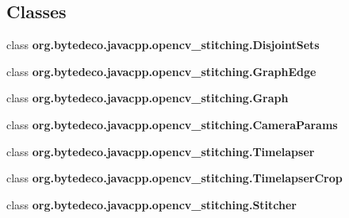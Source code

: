 \subsection*{Classes}
\begin{DoxyCompactItemize}
\item 
class {\bfseries org.\+bytedeco.\+javacpp.\+opencv\+\_\+stitching.\+Disjoint\+Sets}
\item 
class {\bfseries org.\+bytedeco.\+javacpp.\+opencv\+\_\+stitching.\+Graph\+Edge}
\item 
class {\bfseries org.\+bytedeco.\+javacpp.\+opencv\+\_\+stitching.\+Graph}
\item 
class {\bfseries org.\+bytedeco.\+javacpp.\+opencv\+\_\+stitching.\+Camera\+Params}
\item 
class {\bfseries org.\+bytedeco.\+javacpp.\+opencv\+\_\+stitching.\+Timelapser}
\item 
class {\bfseries org.\+bytedeco.\+javacpp.\+opencv\+\_\+stitching.\+Timelapser\+Crop}
\item 
class {\bfseries org.\+bytedeco.\+javacpp.\+opencv\+\_\+stitching.\+Stitcher}
\end{DoxyCompactItemize}
